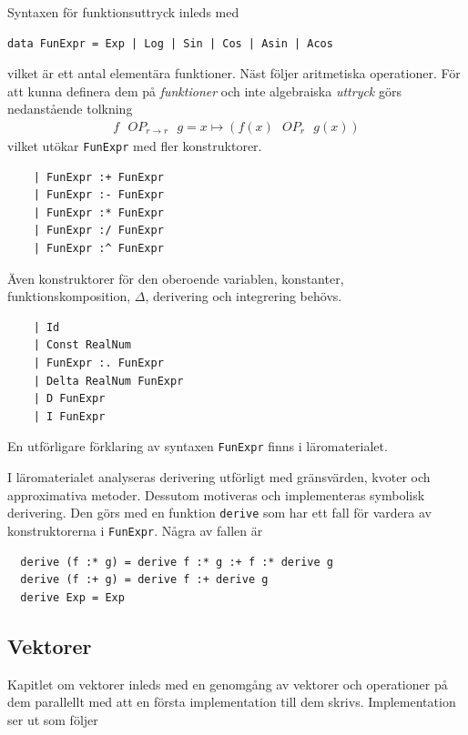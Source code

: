 Syntaxen för funktionsuttryck inleds med

\begin{lstlisting}
data FunExpr = Exp | Log | Sin | Cos | Asin | Acos
\end{lstlisting}

vilket är ett antal elementära funktioner. Näst följer aritmetiska operationer. För att kunna definera dem på \textit{funktioner} och inte algebraiska \textit{uttryck} görs nedanstående tolkning
\begin{align*}
  f \text{ $OP_{r \to r}$ } g = x \mapsto (f(x) \text{ $OP_r$ } g(x))
\end{align*}
vilket utökar \texttt{FunExpr} med fler konstruktorer.

\begin{lstlisting}
    | FunExpr :+ FunExpr
    | FunExpr :- FunExpr
    | FunExpr :* FunExpr
    | FunExpr :/ FunExpr
    | FunExpr :^ FunExpr
\end{lstlisting}

Även konstruktorer för den oberoende variablen, konstanter, funktionskomposition, $\Delta$, derivering och integrering behövs.

\begin{lstlisting}
    | Id
    | Const RealNum
    | FunExpr :. FunExpr
    | Delta RealNum FunExpr
    | D FunExpr
    | I FunExpr
\end{lstlisting}

En utförligare förklaring av syntaxen \texttt{FunExpr} finns i läromaterialet.

I läromaterialet analyseras derivering utförligt med gränsvärden, kvoter och approximativa metoder. Dessutom motiveras och implementeras symbolisk derivering. Den görs med en funktion \texttt{derive} som har ett fall för vardera av konstruktorerna i \texttt{FunExpr}. Några av fallen är

\begin{lstlisting}
  derive (f :* g) = derive f :* g :+ f :* derive g
  derive (f :+ g) = derive f :+ derive g
  derive Exp = Exp
\end{lstlisting}

\subsection{Vektorer}

Kapitlet om vektorer inleds med en genomgång av vektorer och operationer på dem parallellt med att en första implementation till dem skrivs. Implementation ser ut som följer

